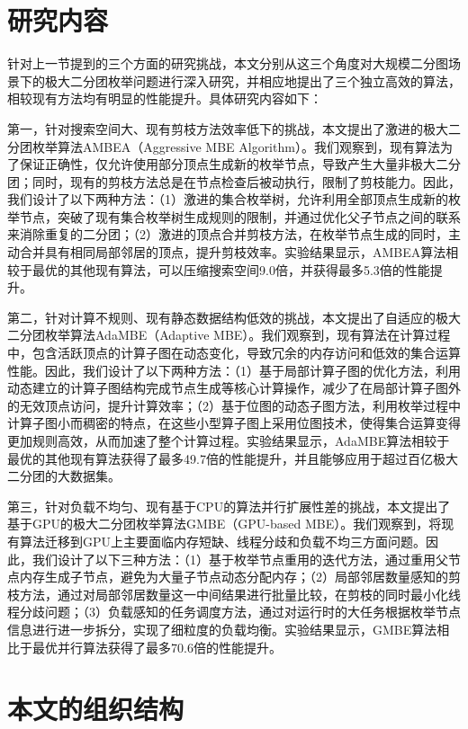 \section{研究内容}



针对上一节提到的三个方面的研究挑战，本文分别从这三个角度对大规模二分图场景下的极大二分团枚举问题进行深入研究，并相应地提出了三个独立高效的算法，相较现有方法均有明显的性能提升。具体研究内容如下：

第一，针对搜索空间大、现有剪枝方法效率低下的挑战，本文提出了激进的极大二分团枚举算法AMBEA（Aggressive MBE Algorithm）。我们观察到，现有算法为了保证正确性，仅允许使用部分顶点生成新的枚举节点，导致产生大量非极大二分团；同时，现有的剪枝方法总是在节点检查后被动执行，限制了剪枝能力。因此，我们设计了以下两种方法：（1）激进的集合枚举树，允许利用全部顶点生成新的枚举节点，突破了现有集合枚举树生成规则的限制，并通过优化父子节点之间的联系来消除重复的二分团；（2）激进的顶点合并剪枝方法，在枚举节点生成的同时，主动合并具有相同局部邻居的顶点，提升剪枝效率。实验结果显示，AMBEA算法相较于最优的其他现有算法，可以压缩搜索空间9.0倍，并获得最多5.3倍的性能提升。

第二，针对计算不规则、现有静态数据结构低效的挑战，本文提出了自适应的极大二分团枚举算法AdaMBE（Adaptive MBE）。我们观察到，现有算法在计算过程中，包含活跃顶点的计算子图在动态变化，导致冗余的内存访问和低效的集合运算性能。因此，我们设计了以下两种方法：（1）基于局部计算子图的优化方法，利用动态建立的计算子图结构完成节点生成等核心计算操作，减少了在局部计算子图外的无效顶点访问，提升计算效率；（2）基于位图的动态子图方法，利用枚举过程中计算子图小而稠密的特点，在这些小型算子图上采用位图技术，使得集合运算变得更加规则高效，从而加速了整个计算过程。实验结果显示，AdaMBE算法相较于最优的其他现有算法获得了最多49.7倍的性能提升，并且能够应用于超过百亿极大二分团的大数据集。

第三，针对负载不均匀、现有基于CPU的算法并行扩展性差的挑战，本文提出了基于GPU的极大二分团枚举算法GMBE（GPU-based MBE）。我们观察到，将现有算法迁移到GPU上主要面临内存短缺、线程分歧和负载不均三方面问题。因此，我们设计了以下三种方法：（1）基于枚举节点重用的迭代方法，通过重用父节点内存生成子节点，避免为大量子节点动态分配内存；（2）局部邻居数量感知的剪枝方法，通过对局部邻居数量这一中间结果进行批量比较，在剪枝的同时最小化线程分歧问题；（3）负载感知的任务调度方法，通过对运行时的大任务根据枚举节点信息进行进一步拆分，实现了细粒度的负载均衡。实验结果显示，GMBE算法相比于最优并行算法获得了最多70.6倍的性能提升。




\section{本文的组织结构}

